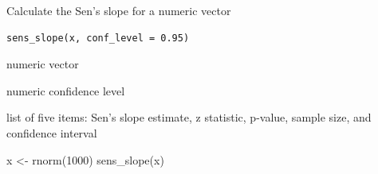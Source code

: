 %
\begin{Description}
Calculate the Sen's slope for a numeric vector
\end{Description}
%
\begin{Usage}
\begin{verbatim}
sens_slope(x, conf_level = 0.95)
\end{verbatim}
\end{Usage}
%
\begin{Arguments}
\begin{ldescription}
\item[\code{x}] numeric vector

\item[\code{conf\_level}] numeric confidence level
\end{ldescription}
\end{Arguments}
%
\begin{Value}
list of five items: Sen's slope estimate,
z statistic, p-value, sample size, and confidence interval
\end{Value}
%
\begin{Examples}
\begin{ExampleCode}
x <- rnorm(1000)
sens_slope(x)
\end{ExampleCode}
\end{Examples}
